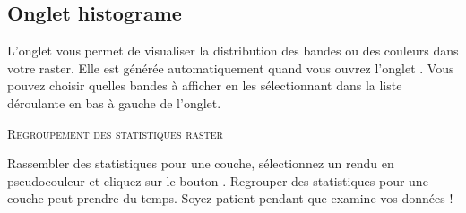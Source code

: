 \subsection{Onglet histograme}\label{label_histogram}

L'onglet  vous permet de visualiser la distribution
 des bandes ou des couleurs dans votre raster. Elle est générée automatiquement quand vous ouvrez l'onglet . Vous pouvez choisir quelles bandes à afficher en les sélectionnant dans la liste déroulante en bas à gauche de l'onglet.



\begin{Tip}\caption{\textsc{Regroupement des statistiques raster}}
Rassembler des statistiques pour une couche, sélectionnez un rendu en pseudocouleur et cliquez sur le bouton . Regrouper des statistiques pour une couche peut prendre du temps. Soyez patient pendant que \qg examine  vos données !
\end{Tip}


